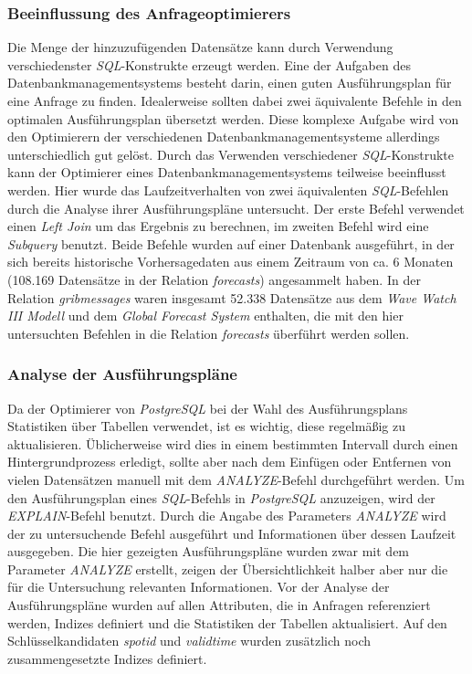 \subsubsection{Beeinflussung des Anfrageoptimierers}
Die Menge der hinzuzufügenden Datensätze kann durch Verwendung
verschiedenster \textit{SQL}-Konstrukte erzeugt werden. Eine der
Aufgaben des Datenbankmanagementsystems besteht darin, einen guten
Ausführungsplan für eine Anfrage zu finden. Idealerweise sollten dabei
zwei äquivalente Befehle in den optimalen Ausführungsplan übersetzt
werden. Diese komplexe Aufgabe wird von den Optimierern der
verschiedenen Datenbankmanagementsysteme allerdings unterschiedlich
gut gelöst. Durch das Verwenden verschiedener \textit{SQL}-Konstrukte
kann der Optimierer eines Datenbankmanagementsystems teilweise
beeinflusst werden. Hier wurde das Laufzeitverhalten von zwei
äquivalenten \textit{SQL}-Befehlen durch die Analyse ihrer
Ausführungspläne untersucht. Der erste Befehl verwendet einen
\textit{Left Join} um das Ergebnis zu berechnen, im zweiten Befehl
wird eine \textit{Subquery} benutzt. Beide Befehle wurden auf einer
Datenbank ausgeführt, in der sich bereits historische Vorhersagedaten
aus einem Zeitraum von ca. 6 Monaten (108.169 Datensätze in der
Relation \textit{forecasts}) angesammelt haben. In der Relation
\textit{grib\textunderscore messages} waren insgesamt 52.338
Datensätze aus dem \textit{Wave Watch III Modell} und dem
\textit{Global Forecast System} enthalten, die mit den hier
untersuchten Befehlen in die Relation \textit{forecasts} überführt
werden sollen.

\subsubsection{Analyse der Ausführungspläne}
Da der Optimierer von \textit{PostgreSQL} bei der Wahl des
Ausführungsplans Statistiken über Tabellen verwendet, ist es wichtig,
diese regelmäßig zu aktualisieren. Üblicherweise wird dies in einem
bestimmten Intervall durch einen Hintergrundprozess erledigt, sollte
aber nach dem Einfügen oder Entfernen von vielen Datensätzen manuell
mit dem \textit{ANALYZE}-Befehl durchgeführt werden. Um den
Ausführungsplan eines \textit{SQL}-Befehls in \textit{PostgreSQL}
anzuzeigen, wird der \textit{EXPLAIN}-Befehl benutzt. Durch die Angabe
des Parameters \textit{ANALYZE} wird der zu untersuchende Befehl
ausgeführt und Informationen über dessen Laufzeit ausgegeben. Die hier
gezeigten Ausführungspläne wurden zwar mit dem Parameter
\textit{ANALYZE} erstellt, zeigen der Übersichtlichkeit halber aber
nur die für die Untersuchung relevanten Informationen. Vor der Analyse
der Ausführungspläne wurden auf allen Attributen, die in Anfragen
referenziert werden, Indizes definiert und die Statistiken der
Tabellen aktualisiert. Auf den Schlüsselkandidaten
\textit{spot\textunderscore id} und \textit{valid\textunderscore time}
wurden zusätzlich noch zusammengesetzte Indizes definiert.

